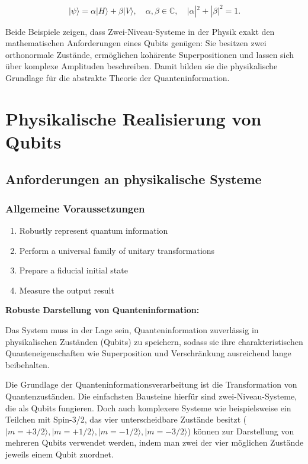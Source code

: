 \[
|\psi\rangle = \alpha |H\rangle + \beta |V\rangle, \quad \alpha, \beta \in \mathbb{C}, \quad |\alpha|^2 + |\beta|^2 = 1.
\]

Beide Beispiele zeigen, dass Zwei-Niveau-Systeme in der Physik exakt den mathematischen Anforderungen eines Qubits genügen: Sie besitzen zwei orthonormale Zustände, ermöglichen kohärente Superpositionen und lassen sich über komplexe Amplituden beschreiben. Damit bilden sie die physikalische Grundlage für die abstrakte Theorie der Quanteninformation.



\section{Physikalische Realisierung von Qubits }
\subsection{Anforderungen an physikalische Systeme }
\subsubsection{Allgemeine Voraussetzungen}

\begin{enumerate}
    \item Robustly represent quantum information
    \item Perform a universal family of unitary transformations
    \item Prepare a fiducial initial state
    \item Measure the output result
\end{enumerate}

\textbf{Robuste Darstellung von Quanteninformation:}

 Das System muss in der Lage sein, Quanteninformation zuverlässig in physikalischen Zuständen (Qubits) zu speichern, sodass sie ihre charakteristischen Quanteneigenschaften wie Superposition und Verschränkung ausreichend lange beibehalten. 

Die Grundlage der Quanteninformationsverarbeitung ist die Transformation von Quantenzuständen. Die einfachsten Bausteine hierfür sind zwei-Niveau-Systeme, die als Qubits fungieren. Doch auch komplexere Systeme wie beispielsweise ein Teilchen mit Spin-3/2, das vier unterscheidbare Zustände besitzt ($|m = +3/2\rangle, |m = +1/2\rangle, |m = -1/2\rangle, |m = -3/2\rangle$) 
können zur Darstellung von mehreren Qubits verwendet werden, 
indem man zwei der vier möglichen Zustände jeweils einem Qubit zuordnet.

